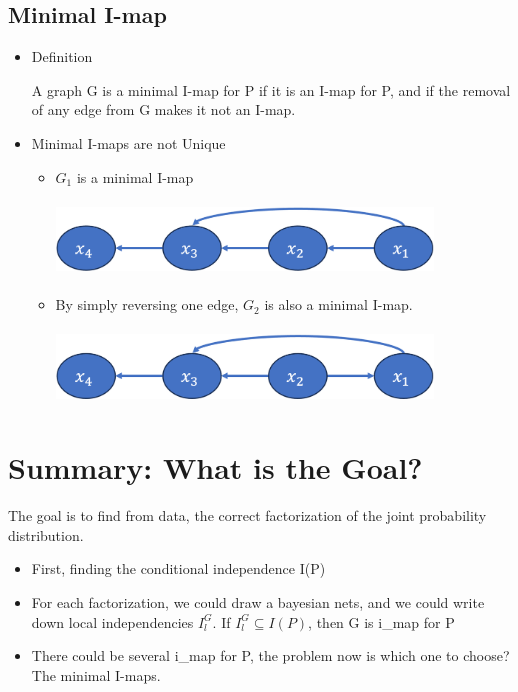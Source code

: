\documentclass[11pt,a4paper]{report}
\begin{document}
\begin{itemize}
\section{Minimal I-map}
\begin{itemize}
    \item Definition
    
    A graph G is a minimal I-map for P if it is an I-map for P, and if the removal of any edge from G makes it not an I-map.

    \item Minimal I-maps are not Unique
    
    \begin{itemize}
        \item $G_{1}$ is a minimal I-map
        
        \includegraphics[width = 10cm, height = 2cm]{imap_2.png}
        \item By simply reversing one edge, $G_{2}$ is also a minimal I-map.
        
        \includegraphics[width = 10cm, height = 2cm]{imap_3.png}
    \end{itemize}
\end{itemize}
\end{itemize}

\section{Summary: What is the Goal?}

The goal is to find from data, the correct factorization of the joint probability distribution. 

\begin{itemize}
    \item First, finding the conditional independence I(P)
    \item For each factorization, we could draw a bayesian nets, and we could write down local independencies $I_{l}^{G}$. If $I_{l}^{G} \subseteq I(P)$, then G is i\_map for P
    \item There could be several i\_map for P, the problem now is which one to choose? The minimal I-maps.
\end{itemize}
\end{document}
